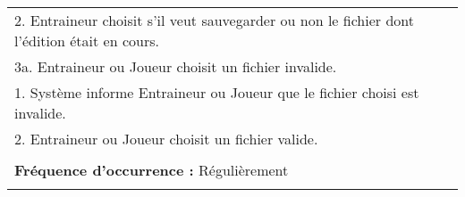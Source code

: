 \begin{longtable}{|p{16cm}|}
	\hspace{1cm}2. Entraineur choisit s'il veut sauvegarder ou non le fichier dont l'édition était en cours.\\
	3a. Entraineur ou Joueur choisit un fichier invalide.\\
	\hspace{1cm}1. Système informe Entraineur ou Joueur que le fichier choisi est invalide.\\
	\hspace{1cm}2. Entraineur ou Joueur choisit un fichier valide.\\
	\\
	\textbf{Fréquence d'occurrence :} Régulièrement\\
	\\
	\hline
\end{longtable}

